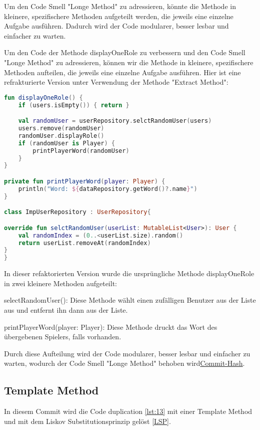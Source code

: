 Um den Code Smell "Longe Method" zu adressieren, könnte die Methode in kleinere, spezifischere Methoden aufgeteilt werden, die jeweils eine einzelne Aufgabe ausführen. Dadurch wird der Code modularer, besser lesbar und einfacher zu warten.


Um den Code der Methode displayOneRole zu verbessern und den Code Smell "Longe Method" zu adressieren, können wir die Methode in kleinere, spezifischere Methoden aufteilen, die jeweils eine einzelne Aufgabe ausführen. Hier ist eine refrakturierte Version unter Verwendung der Methode "Extract Method":

\begin{lstlisting}[language=Kotlin, caption={Extract Method}, label={lst:7}]
fun displayOneRole() {
    if (users.isEmpty()) { return }

    val randomUser = userRepository.selctRandomUser(users)
    users.remove(randomUser)
    randomUser.displayRole()
    if (randomUser is Player) {
        printPlayerWord(randomUser)
    }
}

private fun printPlayerWord(player: Player) {
    println("Word: ${dataRepository.getWord()?.name}")
}

class ImpUserRepository : UserRepository{

override fun selctRandomUser(userList: MutableList<User>): User {
    val randomIndex = (0..<userList.size).random()
    return userList.removeAt(randomIndex)
}
}

\end{lstlisting}
In dieser refaktorierten Version wurde die ursprüngliche Methode displayOneRole in zwei kleinere Methoden aufgeteilt:

    selectRandomUser(): Diese Methode wählt einen zufälligen Benutzer aus der Liste aus und entfernt ihn dann aus der Liste.
    
    printPlayerWord(player: Player): Diese Methode druckt das Wort des übergebenen Spielers, falls vorhanden.

Durch diese Aufteilung wird der Code modularer, besser lesbar und einfacher zu warten, wodurch der Code Smell "Longe Method" behoben wird\href{https://github.com/lorenz1702/Spy-Game/commit/ef557ef3a24fecf2d3747dbc6dbf457b8c440d5c}{Commit-Hash}.

\subsection{Template Method}
In diesem Commit wird die Code duplication \ref{lst:13} mit einer Template Method und mit dem Liskov Substitutionsprinzip gelöst \ref{LSP}.

